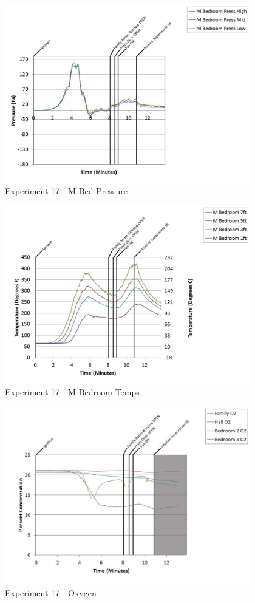 \documentclass{article}
\begin{document}
\begin{appendices}
	\clearpage

	\begin{figure}[h!]
		\centering
		\includegraphics[height=3.05in]{0_Images/Results_Charts/Exp_17_Charts/MBedPressure.pdf}
		\caption{Experiment 17 - M Bed Pressure}
	\end{figure}
 

	\begin{figure}[h!]
		\centering
		\includegraphics[height=3.05in]{0_Images/Results_Charts/Exp_17_Charts/MBedroomTemps.pdf}
		\caption{Experiment 17 - M Bedroom Temps}
	\end{figure}
 
	\clearpage

	\begin{figure}[h!]
		\centering
		\includegraphics[height=3.05in]{0_Images/Results_Charts/Exp_17_Charts/Oxygen.pdf}
		\caption{Experiment 17 - Oxygen}
	\end{figure}
 


\end{appendices}
\end{document}
